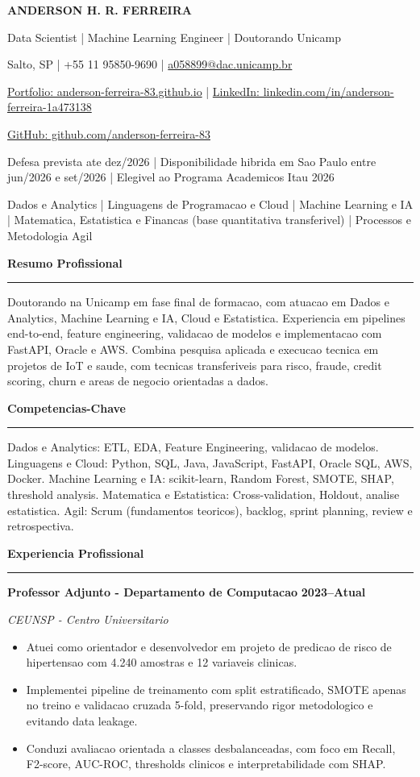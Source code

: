 \documentclass[10pt,a4paper]{article}
\newcommand{\cvsection}[1]{%
    \vspace{0.4em}
    {\large\bfseries #1}\par
    \vspace{0.08em}
    \hrule
    \vspace{0.18em}
}
\newcommand{\jobentry}[4]{%
    \textbf{#1} \hfill \textbf{#2}\par
    \textit{#3}\par
    #4
    \vspace{0.15em}
}
\begin{document}
{\LARGE\bfseries ANDERSON H. R. FERREIRA}\par
\vspace{0.18em}
{\normalsize Data Scientist | Machine Learning Engineer | Doutorando Unicamp}\par
\vspace{0.28em}

Salto, SP | +55 11 95850-9690 | \href{mailto:a058899@dac.unicamp.br}{a058899@dac.unicamp.br}\par
\href{https://anderson-ferreira-83.github.io/}{Portfolio: anderson-ferreira-83.github.io} | \href{https://www.linkedin.com/in/anderson-ferreira-1a473138/?locale=pt}{LinkedIn: linkedin.com/in/anderson-ferreira-1a473138}\par
\href{https://github.com/anderson-ferreira-83}{GitHub: github.com/anderson-ferreira-83}\par
Defesa prevista ate dez/2026 | Disponibilidade hibrida em Sao Paulo entre jun/2026 e set/2026 | Elegivel ao Programa Academicos Itau 2026
\par Dados e Analytics | Linguagens de Programacao e Cloud | Machine Learning e IA | Matematica, Estatistica e Financas (base quantitativa transferivel) | Processos e Metodologia Agil

\cvsection{Resumo Profissional}
Doutorando na Unicamp em fase final de formacao, com atuacao em Dados e Analytics, Machine Learning e IA, Cloud e Estatistica. Experiencia em pipelines end-to-end, feature engineering, validacao de modelos e implementacao com FastAPI, Oracle e AWS. Combina pesquisa aplicada e execucao tecnica em projetos de IoT e saude, com tecnicas transferiveis para risco, fraude, credit scoring, churn e areas de negocio orientadas a dados.

\cvsection{Competencias-Chave}
Dados e Analytics: ETL, EDA, Feature Engineering, validacao de modelos. Linguagens e Cloud: Python, SQL, Java, JavaScript, FastAPI, Oracle SQL, AWS, Docker. Machine Learning e IA: scikit-learn, Random Forest, SMOTE, SHAP, threshold analysis. Matematica e Estatistica: Cross-validation, Holdout, analise estatistica. Agil: Scrum (fundamentos teoricos), backlog, sprint planning, review e retrospectiva.

\cvsection{Experiencia Profissional}
\jobentry{Professor Adjunto - Departamento de Computacao}{2023--Atual}{CEUNSP - Centro Universitario}{
\begin{itemize}
    \item Atuei como orientador e desenvolvedor em projeto de predicao de risco de hipertensao com 4.240 amostras e 12 variaveis clinicas.
    \item Implementei pipeline de treinamento com split estratificado, SMOTE apenas no treino e validacao cruzada 5-fold, preservando rigor metodologico e evitando data leakage.
    \item Conduzi avaliacao orientada a classes desbalanceadas, com foco em Recall, F2-score, AUC-ROC, thresholds clinicos e interpretabilidade com SHAP.
\end{itemize}
}
\end{document}

